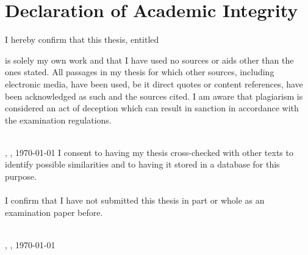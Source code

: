 \chapter*{Declaration of Academic Integrity}
I hereby confirm that this thesis, entitled 

\begin{center}
	\textit{\printtitle}
\end{center}

is solely my own work and that I have used no sources or aids other than the ones stated. All passages in my thesis for which other sources, including electronic media, have been used, be it direct quotes or content references, have been acknowledged as such and the sources cited. I am aware that plagiarism is considered an act of deception which can result in sanction in accordance with the examination regulations.

\vspace{0.75cm}
\parbox{17em}{\hrulefill} \\
\printname, \printcity, \today
\vspace{0.75cm}
I consent to having my thesis cross-checked with other texts to identify possible similarities and to having it stored in a database for this purpose.
\\
\\
I confirm that I have not submitted this thesis in part or whole as an examination paper before.

\vspace{0.75cm}
\parbox{17em}{\hrulefill} \\
\printname, \printcity, \today
